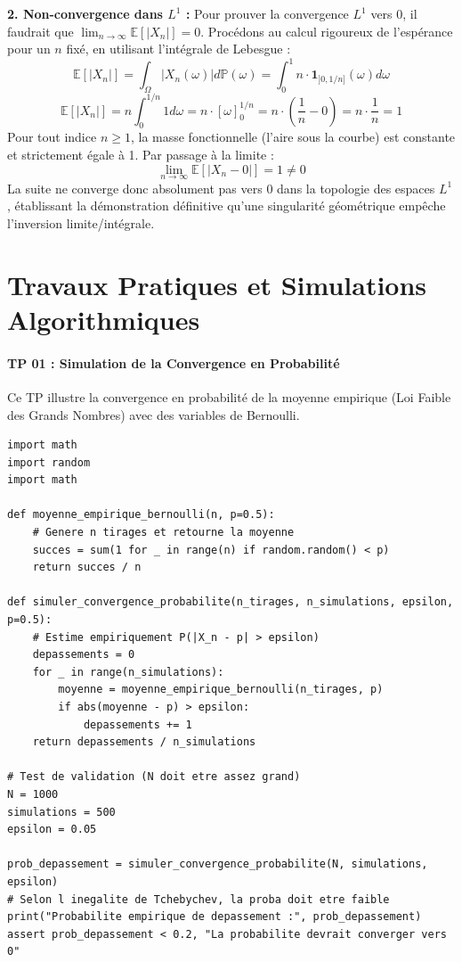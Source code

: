 \documentclass[11pt,a4paper]{article}
\begin{document}
\textbf{2. Non-convergence dans $L^1$ :}
Pour prouver la convergence $L^1$ vers 0, il faudrait que $\lim_{n \to \infty} \mathbb{E}[|X_n|] = 0$.
Procédons au calcul rigoureux de l'espérance pour un $n$ fixé, en utilisant l'intégrale de Lebesgue :
$$ \mathbb{E}[|X_n|] = \int_{\Omega} |X_n(\omega)| d\mathbb{P}(\omega) = \int_0^1 n \cdot \mathbf{1}_{]0, 1/n]}(\omega) d\omega $$
$$ \mathbb{E}[|X_n|] = n \int_0^{1/n} 1 d\omega = n \cdot \left[ \omega \right]_0^{1/n} = n \cdot \left( \frac{1}{n} - 0 \right) = n \cdot \frac{1}{n} = 1 $$
Pour tout indice $n \ge 1$, la masse fonctionnelle (l'aire sous la courbe) est constante et strictement égale à 1.
Par passage à la limite :
$$ \lim_{n \to \infty} \mathbb{E}[|X_n - 0|] = 1 \neq 0 $$
La suite ne converge donc absolument pas vers 0 dans la topologie des espaces $L^1$, établissant la démonstration définitive qu'une singularité géométrique empêche l'inversion limite/intégrale.

\part{Travaux Pratiques et Simulations Algorithmiques}
\subsection*{TP 01 : Simulation de la Convergence en Probabilité}

Ce TP illustre la convergence en probabilité de la moyenne empirique (Loi Faible des Grands Nombres) avec des variables de Bernoulli.

\begin{lstlisting}
import math
import random
import math

def moyenne_empirique_bernoulli(n, p=0.5):
    # Genere n tirages et retourne la moyenne
    succes = sum(1 for _ in range(n) if random.random() < p)
    return succes / n

def simuler_convergence_probabilite(n_tirages, n_simulations, epsilon, p=0.5):
    # Estime empiriquement P(|X_n - p| > epsilon)
    depassements = 0
    for _ in range(n_simulations):
        moyenne = moyenne_empirique_bernoulli(n_tirages, p)
        if abs(moyenne - p) > epsilon:
            depassements += 1
    return depassements / n_simulations

# Test de validation (N doit etre assez grand)
N = 1000
simulations = 500
epsilon = 0.05

prob_depassement = simuler_convergence_probabilite(N, simulations, epsilon)
# Selon l inegalite de Tchebychev, la proba doit etre faible
print("Probabilite empirique de depassement :", prob_depassement)
assert prob_depassement < 0.2, "La probabilite devrait converger vers 0"
\end{lstlisting}
\end{document}
